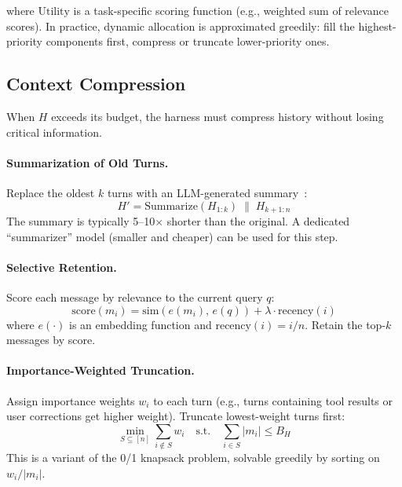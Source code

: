 where $\text{Utility}$ is a task-specific scoring function (e.g., weighted sum of relevance scores). In practice, dynamic allocation is approximated greedily: fill the highest-priority components first, compress or truncate lower-priority ones.

\subsection{Context Compression}
\label{context-compression}

When $H$ exceeds its budget, the harness must compress history without losing critical information.

\paragraph{Summarization of Old Turns.}
\label{summarization-of-old-turns.}

Replace the oldest $k$ turns with an LLM-generated summary~\cite{packer2023memgpt}: 
\begin{equation}
H' = \text{Summarize}(H_{1:k}) \;\|\; H_{k+1:n}
\end{equation}
 The summary is typically 5--10$\times$ shorter than the original. A dedicated ``summarizer'' model (smaller and cheaper) can be used for this step.

\paragraph{Selective Retention.}
\label{selective-retention.}

Score each message by relevance to the current query $q$: 
\begin{equation}
\text{score}(m_i) = \text{sim}(e(m_i),\, e(q)) + \lambda \cdot \text{recency}(i)
\end{equation}
 where $e(\cdot)$ is an embedding function and $\text{recency}(i) = i/n$. Retain the top-$k$ messages by score.

\paragraph{Importance-Weighted Truncation.}
\label{importance-weighted-truncation.}

Assign importance weights $w_i$ to each turn (e.g., turns containing tool results or user corrections get higher weight). Truncate lowest-weight turns first: 
\begin{equation}
\min_{S \subseteq [n]} \sum_{i \notin S} w_i \quad \text{s.t.} \quad \sum_{i \in S} |m_i| \leq B_H
\end{equation}
 This is a variant of the 0/1 knapsack problem, solvable greedily by sorting on $w_i / |m_i|$.


